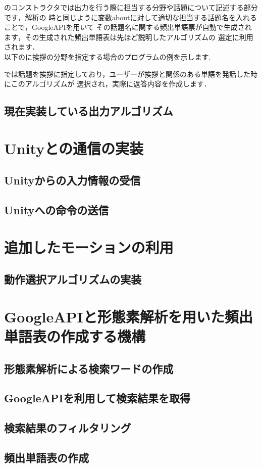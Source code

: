 のコンストラクタでは出力を行う際に担当する分野や話題について記述する部分です，解析の
時と同じように変数aboutに対して適切な担当する話題名を入れることで，GoogleAPIを用いて
その話題名に関する頻出単語票が自動で生成されます，その生成された頻出単語表は先ほど説明したアルゴリズムの
選定に利用されます．\\

以下のに挨拶の分野を指定する場合のプログラムの例を示します. \\


では話題を挨拶に指定しており，ユーザーが挨拶と関係のある単語を発話した時にこのアルゴリズムが
選択され，実際に返答内容を作成します．\\

\subsection{現在実装している出力アルゴリズム}


\section{Unityとの通信の実装}
\subsection{Unityからの入力情報の受信}
\subsection{Unityへの命令の送信}

\section{追加したモーションの利用}
\subsection{動作選択アルゴリズムの実装}

\section{GoogleAPIと形態素解析を用いた頻出単語表の作成する機構}
\subsection{形態素解析による検索ワードの作成}
\subsection{GoogleAPIを利用して検索結果を取得}
\subsection{検索結果のフィルタリング}
\subsection{頻出単語表の作成}



